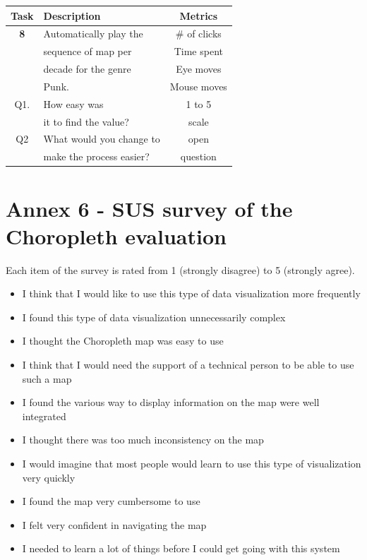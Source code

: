 \documentclass[twocolumn, letterpaper,13pt]{scrartcl}
\begin{document}
    \begin{center}
    \begin{tabular} { | c | l | c | }
    \hline
     Task & Description & Metrics \\
    \hline
    \textbf{8} & Automatically play the & \# of clicks \\
    & sequence of map per & Time spent\\
    & decade for the genre & Eye moves\\
    & Punk. & Mouse moves\\
    \hline
    Q1. & How easy was & 1 to 5\\
    & it to find the value? & scale \\
    \hline
    Q2 & What would you change to & open\\
    & make the process easier? & question\\
    \hline
    \end{tabular}
    \end{center}
    
    \section*{Annex 6 - SUS survey of the Choropleth evaluation} 
    
    Each item of the survey is rated from 1 (strongly disagree) to 5 (strongly agree).
    
    \begin{itemize}
        \item I think that I would like to use this type of data visualization more frequently
        \item I found this type of data visualization unnecessarily complex
        \item I thought the Choropleth map was easy to use
        \item I think that I would need the support of a technical person to be able to use such a map
        \item I found the various way to display information on the map were well integrated
        \item I thought there was too much inconsistency on the map
        \item I would imagine that most people would learn to use this type of visualization very quickly
        \item I found the map very cumbersome to use
        \item I felt very confident in navigating the map
        \item I needed to learn a lot of things before I could get going with this system
    \end{itemize}
\end{document}
